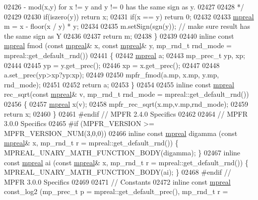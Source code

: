 \begin{DoxyCode}
{{02426 \textcolor{comment}{    - mod(x,y) for x != y and y != 0 has the same sign as y.}
02427 \textcolor{comment}{}
02428 \textcolor{comment}{    */}
02429 
02430     \textcolor{keywordflow}{if}(iszero(y)) \textcolor{keywordflow}{return} x;
02431     \textcolor{keywordflow}{if}(x == y) \textcolor{keywordflow}{return} 0;
02432 
02433     \hyperlink{classmpfr_1_1mpreal}{mpreal} m = x - floor(x / y) * y;
02434 
02435     m.setSign(sgn(y)); \textcolor{comment}{// make sure result has the same sign as Y}
02436 
02437     \textcolor{keywordflow}{return} m;
02438 \}
02439 
02440 \textcolor{keyword}{inline} \textcolor{keyword}{const} \hyperlink{classmpfr_1_1mpreal}{mpreal} fmod (\textcolor{keyword}{const} \hyperlink{classmpfr_1_1mpreal}{mpreal}& x, \textcolor{keyword}{const} \hyperlink{classmpfr_1_1mpreal}{mpreal}& y, mp\_rnd\_t rnd\_mode = 
      mpreal::get\_default\_rnd())
02441 \{
02442     \hyperlink{classmpfr_1_1mpreal}{mpreal} a;
02443     mp\_prec\_t yp, xp;
02444 
02445     yp = y.get\_prec();
02446     xp = x.get\_prec();
02447 
02448     a.set\_prec(yp>xp?yp:xp);
02449 
02450     mpfr\_fmod(a.mp, x.mp, y.mp, rnd\_mode);
02451 
02452     \textcolor{keywordflow}{return} a;
02453 \}
02454 
02455 \textcolor{keyword}{inline} \textcolor{keyword}{const} \hyperlink{classmpfr_1_1mpreal}{mpreal} rec\_sqrt(\textcolor{keyword}{const} \hyperlink{classmpfr_1_1mpreal}{mpreal}& v, mp\_rnd\_t rnd\_mode = mpreal::get\_default\_rnd())
02456 \{
02457     \hyperlink{classmpfr_1_1mpreal}{mpreal} x(v);
02458     mpfr\_rec\_sqrt(x.mp,v.mp,rnd\_mode);
02459     \textcolor{keywordflow}{return} x;
02460 \}
02461 \textcolor{preprocessor}{#endif //  MPFR 2.4.0 Specifics}
02462 
02464 \textcolor{comment}{// MPFR 3.0.0 Specifics}
02465 \textcolor{preprocessor}{#if (MPFR\_VERSION >= MPFR\_VERSION\_NUM(3,0,0))}
02466 \textcolor{keyword}{inline} \textcolor{keyword}{const} \hyperlink{classmpfr_1_1mpreal}{mpreal} digamma (\textcolor{keyword}{const} \hyperlink{classmpfr_1_1mpreal}{mpreal}& x, mp\_rnd\_t r = mpreal::get\_default\_rnd()) \{   
      MPREAL\_UNARY\_MATH\_FUNCTION\_BODY(digamma);     \}
02467 \textcolor{keyword}{inline} \textcolor{keyword}{const} \hyperlink{classmpfr_1_1mpreal}{mpreal} ai      (\textcolor{keyword}{const} \hyperlink{classmpfr_1_1mpreal}{mpreal}& x, mp\_rnd\_t r = mpreal::get\_default\_rnd()) \{   
      MPREAL\_UNARY\_MATH\_FUNCTION\_BODY(ai);          \}
02468 \textcolor{preprocessor}{#endif // MPFR 3.0.0 Specifics}
02469 
02471 \textcolor{comment}{// Constants}
02472 \textcolor{keyword}{inline} \textcolor{keyword}{const} \hyperlink{classmpfr_1_1mpreal}{mpreal} const\_log2 (mp\_prec\_t p = mpreal::get\_default\_prec(), mp\_rnd\_t r = 
}}
\end{DoxyCode}
